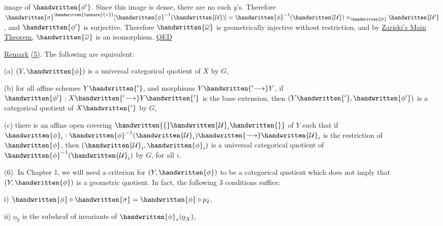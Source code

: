 image of $\handwritten{\phi'}$. Since this image is dense, there are no such $y$'s. Therefore $\handwritten{\sigma}^{\handwritten{\unsure{\prime|\vee}}}[\handwritten{\phi}^{-1}(\handwritten{\mathcal U})]=\handwritten{\phi}^{-1}(\handwritten{\mathcal U})\times_{\handwritten{\mathcal U}}\handwritten{\mathcal U'}$, and $\handwritten{\phi'}$ is surjective. Therefore $\handwritten{\overline\omega}$ is geometrically injective without restriction, and by \uline{Zariski's Main Theorem}, $\handwritten{\overline\omega}$ is an isomorphism. \uline{QED}
\margin{\handwritten{!}}

\uline{Remark} \uline{(5)}. The following are equivalent:

(a) $(Y,\handwritten{\phi})$ is a universal categorical quotient of $X$ by $G$,

(b) for all affine schemes $Y\handwritten{'}$, and morphisms $Y\handwritten{'\longrightarrow}Y$, if $\handwritten{\phi'}:X\handwritten{'\longrightarrow}Y\handwritten{'}$ is the base extension, then $(Y\handwritten{'},\handwritten{\phi'})$ is a categorical quotient of $X\handwritten{'}$ by $G$,

(c) there is an affine open covering $\handwritten{\{}\handwritten{\mathcal U}_i\handwritten{\}}$ of $Y$ such that if $\handwritten{\phi}_i:\handwritten{\phi}^{-1}(\handwritten{\mathcal U}_i)\handwritten{\longrightarrow}\handwritten{\mathcal U}_i$ is the restriction of $\handwritten{\phi}$, then $(\handwritten{\mathcal U}_i,\handwritten{\phi}_i)$ is a universal categorical quotient of $\handwritten{\phi}^{-1}(\handwritten{\mathcal U}_i)$ by $G$, for all $i$.

(6). In Chapter 1, we will need a criterion for $(Y,\handwritten{\phi})$ to be a categorical quotient which does not imply that $(Y,\handwritten{\phi})$ is a geometric quotient. In fact, the following 3 conditions suffice:

i) $\handwritten{\phi}\circ\handwritten{\sigma}=\handwritten{\phi}\circ p_2$,

ii) $\underline{\mathrm{o}}_Y$ is the subsheaf of invariants of $\handwritten{\phi}_*(\underline{\mathrm{o}}_X)$,

